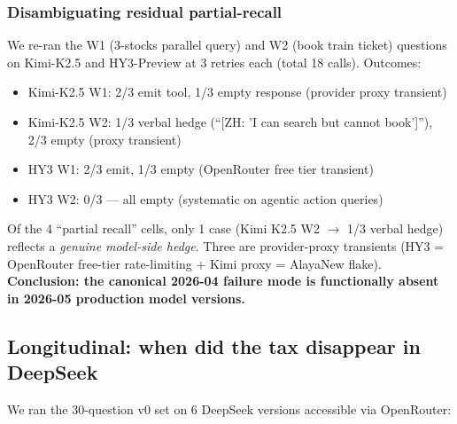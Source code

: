 \documentclass[11pt]{article}
\providecommand{\tightlist}{\setlength{\itemsep}{0pt}\setlength{\parskip}{0pt}}
\begin{document}
\subsubsection{Disambiguating residual
partial-recall}\label{sec:disambiguating-residual-partial-recall}

We re-ran the W1 (3-stocks parallel query) and W2 (book train ticket)
questions on Kimi-K2.5 and HY3-Preview at 3 retries each (total 18
calls). Outcomes:

\begin{itemize}
\tightlist
\item
  Kimi-K2.5 W1: 2/3 emit tool, 1/3 empty response (provider proxy
  transient)
\item
  Kimi-K2.5 W2: 1/3 verbal hedge (``[ZH: 'I can search but cannot book']''), 2/3 empty (proxy
  transient)
\item
  HY3 W1: 2/3 emit, 1/3 empty (OpenRouter free tier transient)
\item
  HY3 W2: 0/3 --- all empty (systematic on agentic action queries)
\end{itemize}

Of the 4 ``partial recall'' cells, only 1 case (Kimi K2.5 W2 $\rightarrow$ 1/3
verbal hedge) reflects a \emph{genuine model-side hedge}. Three are
provider-proxy transients (HY3 = OpenRouter free-tier rate-limiting +
Kimi proxy = AlayaNew flake). \textbf{Conclusion: the canonical 2026-04
failure mode is functionally absent in 2026-05 production model
versions.}

\subsection{Longitudinal: when did the tax disappear in
DeepSeek}\label{sec:longitudinal-when-did-the-tax-disappear-in-deepseek}

We ran the 30-question v0 set on 6 DeepSeek versions accessible via
OpenRouter:
\end{document}
